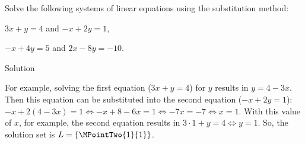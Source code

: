 \begin{MExercises}
\begin{MExercise}
Solve the following systems of linear equations using the substitution method:
\begin{MExerciseItems}
\item{$3 x + y = 4$ and $- x + 2 y = 1$,}
\item{$- x + 4 y = 5$ and $2 x - 8 y = - 10$.}
\end{MExerciseItems}

\begin{MHint}{Solution}
\begin{MExerciseItems}
\item{For example, solving the first equation ($3 x + y = 4$) for $y$ results in
$y = 4 - 3 x$. Then this equation can be substituted into the second equation ($- x + 2 y = 1$):
$- x + 2 (4 - 3 x) = 1 \Leftrightarrow - x + 8 - 6 x = 1 \Leftrightarrow - 7 x = - 7
\Leftrightarrow x = 1$. With this value of $x$, for example, the second equation results in
$3 \cdot 1 + y = 4 \Leftrightarrow y = 1$. So, the solution set is 
${\ML} = \{ \MPointTwo{1}{1} \}$.

}
\end{MExerciseItems}
\end{MHint}
\end{MExercise}
\end{MExercises}
